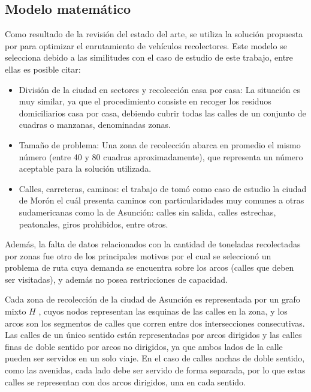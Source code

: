 \subsection{Modelo matemático}

Como resultado de la revisión del estado del arte, se utiliza la solución propuesta por \citet{Braier2017AnArgentina} para optimizar el enrutamiento de vehículos recolectores. Este modelo se selecciona debido a las similitudes con el caso de estudio de este trabajo, entre ellas es posible citar:

\begin{itemize}
    \item División de la ciudad en sectores y recolección casa por casa: La situación es muy similar, ya que el procedimiento consiste en recoger los residuos domiciliarios casa por casa, debiendo cubrir todas las calles de un conjunto de cuadras o manzanas, denominadas zonas.
    \item Tamaño de problema: Una zona de recolección abarca en promedio el mismo número (entre 40 y 80 cuadras aproximadamente), que representa un número aceptable para la solución utilizada.
    \item Calles, carreteras, caminos: el trabajo de \citet{Braier2017AnArgentina} tomó como caso de estudio la ciudad de Morón el cuál presenta caminos con particularidades muy comunes a otras sudamericanas como la de Asunción: calles sin salida, calles estrechas, peatonales, giros prohibidos, entre otros.
\end{itemize}

Además, la falta de datos relacionados con la cantidad de toneladas recolectadas por zonas fue otro de los principales motivos por el cual se seleccionó un problema de ruta cuya demanda se encuentra sobre los arcos (calles que deben ser visitadas), y además no posea restricciones de capacidad.

Cada zona de recolección de la ciudad de Asunción es representada por un grafo mixto $H$ \citep{Braier2017AnArgentina}, cuyos nodos representan las esquinas de las calles en la zona, y los arcos son los segmentos de calles que corren entre dos intersecciones consecutivas. Las calles de un único sentido están representadas por arcos dirigidos y las calles finas de doble sentido por arcos no dirigidos, ya que ambos lados de la calle pueden ser servidos en un solo viaje. En el caso de calles anchas de doble sentido, como las avenidas, cada lado debe ser servido de forma separada, por lo que estas calles se representan con dos arcos dirigidos, una en cada sentido.

